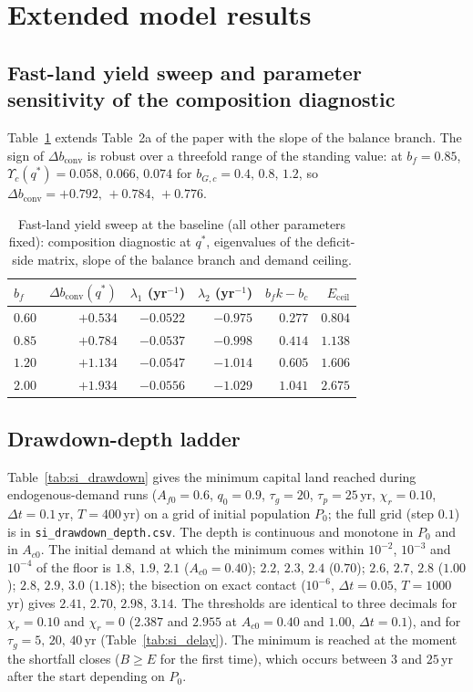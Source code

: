 \documentclass[11pt,a4paper]{article}
\newcommand{\dconv}{\Delta b_{\mathrm{conv}}}
\newcommand{\Ups}{\Upsilon_c}
\newcommand{\Eceil}{E_{\mathrm{ceil}}}
\begin{document}
\section{Extended model results}\label{si:results}

\subsection{Fast-land yield sweep and parameter sensitivity of the composition diagnostic}\label{si:sweep}

Table~\ref{tab:si_sweep} extends Table~2a of the paper with the slope of the balance branch. The sign of $\dconv$ is robust over a threefold range of the standing value: at $b_f=0.85$, $\Ups(q^*)=0.058,\,0.066,\,0.074$ for $b_{G,c}=0.4,\,0.8,\,1.2$, so $\dconv=+0.792,\,+0.784,\,+0.776$.

\begin{table}[htbp]
\centering\small
\caption{Fast-land yield sweep at the baseline (all other parameters fixed): composition diagnostic at $q^*$, eigenvalues of the deficit-side matrix, slope of the balance branch and demand ceiling.}
\label{tab:si_sweep}
\begin{tabular}{l r r r r r}
\toprule
$b_f$ & $\dconv(q^*)$ & $\lambda_1$ (yr$^{-1}$) & $\lambda_2$ (yr$^{-1}$) & $b_fk-b_c$ & $\Eceil$ \\
\midrule
$0.60$ & $+0.534$ & $-0.0522$ & $-0.975$ & $0.277$ & $0.804$ \\
$0.85$ & $+0.784$ & $-0.0537$ & $-0.998$ & $0.414$ & $1.138$ \\
$1.20$ & $+1.134$ & $-0.0547$ & $-1.014$ & $0.605$ & $1.606$ \\
$2.00$ & $+1.934$ & $-0.0556$ & $-1.029$ & $1.041$ & $2.675$ \\
\bottomrule
\end{tabular}
\end{table}

\subsection{Drawdown-depth ladder}\label{si:ladder}

Table~\ref{tab:si_drawdown} gives the minimum capital land reached during endogenous-demand runs ($A_{f0}=0.6$, $q_0=0.9$, $\tau_g=20$, $\tau_p=25$\,yr, $\chi_r=0.10$, $\Delta t=0.1$\,yr, $T=400$\,yr) on a grid of initial population $P_0$; the full grid (step $0.1$) is in \texttt{si\_drawdown\_depth.csv}. The depth is continuous and monotone in $P_0$ and in $A_{c0}$. The initial demand at which the minimum comes within $10^{-2}$, $10^{-3}$ and $10^{-4}$ of the floor is $1.8,\,1.9,\,2.1$ ($A_{c0}=0.40$); $2.2,\,2.3,\,2.4$ ($0.70$); $2.6,\,2.7,\,2.8$ ($1.00$); $2.8,\,2.9,\,3.0$ ($1.18$); the bisection on exact contact ($10^{-6}$, $\Delta t=0.05$, $T=1000$\,yr) gives $2.41,\,2.70,\,2.98,\,3.14$. The thresholds are identical to three decimals for $\chi_r=0.10$ and $\chi_r=0$ ($2.387$ and $2.955$ at $A_{c0}=0.40$ and $1.00$, $\Delta t=0.1$), and for $\tau_g=5,\,20,\,40$\,yr (Table~\ref{tab:si_delay}). The minimum is reached at the moment the shortfall closes ($B\ge E$ for the first time), which occurs between $3$ and $25$\,yr after the start depending on $P_0$.
\end{document}
